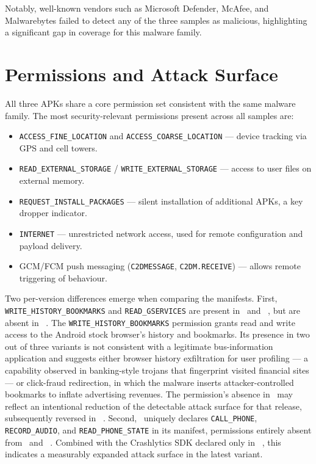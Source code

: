 Notably, well-known vendors such as Microsoft Defender, McAfee, and Malwarebytes failed to detect any of the three samples as malicious, highlighting a significant gap in coverage for this malware family.

\section{Permissions and Attack Surface}
\label{sec:permissions}

All three APKs share a core permission set consistent with the same malware family.
The most security-relevant permissions present across all samples are:

\begin{itemize}
    \item \texttt{ACCESS\_FINE\_LOCATION} and \texttt{ACCESS\_COARSE\_LOCATION} --- device tracking via GPS and cell towers.
    \item \texttt{READ\_EXTERNAL\_STORAGE} / \texttt{WRITE\_EXTERNAL\_STORAGE} --- access to user files on external memory.
    \item \texttt{REQUEST\_INSTALL\_PACKAGES} --- silent installation of additional APKs, a key dropper indicator.
    \item \texttt{INTERNET} --- unrestricted network access, used for remote configuration and payload delivery.
    \item GCM/FCM push messaging (\texttt{C2DMESSAGE}, \texttt{C2DM.RECEIVE}) --- allows remote triggering of behaviour.
\end{itemize}

Two per-version differences emerge when comparing the manifests.
First, \texttt{WRITE\_HISTORY\_BOOKMARKS} and \texttt{READ\_GSERVICES} are present in \oner \  and \threer \ , but are absent in \twor \ .
The \texttt{WRITE\_HISTORY\_BOOKMARKS} permission grants read and write access to the Android stock browser's history and bookmarks. Its presence in two out of three variants is not consistent with a legitimate bus-information application and suggests either browser history exfiltration for user profiling --- a capability observed in banking-style trojans that fingerprint visited financial sites --- or click-fraud redirection, in which the malware inserts attacker-controlled bookmarks to inflate advertising revenues. The permission's absence in \twor \  may reflect an intentional reduction of the detectable attack surface for that release, subsequently reversed in \threer \ .
Second, \threer \  uniquely declares \texttt{CALL\_PHONE}, \texttt{RECORD\_AUDIO}, and \texttt{READ\_PHONE\_STATE} in its manifest, permissions entirely absent from \oner \  and \twor \ .
Combined with the Crashlytics SDK declared only in \threer \ , this indicates a measurably expanded attack surface in the latest variant.

